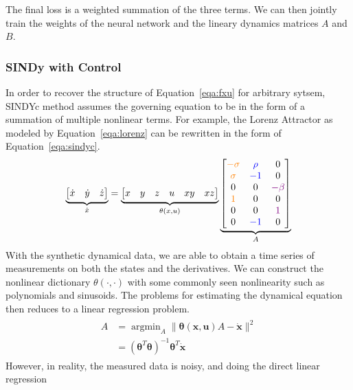 \documentclass[10pt,twocolumn]{article}
\DeclareMathOperator*{\argmin}{argmin}
\begin{document}
The final loss is a weighted summation of the three terms. We can then jointly train the
weights of the neural network and the lineary dynamics matrices $A$ and $B$.

\subsubsection{SINDy with Control \cite{sindyc}}
In order to recover the structure of Equation~\ref{eqa:fxu} for arbitrary sytsem,
SINDYc method assumes the governing equation to be in the form of a summation of
multiple nonlinear terms. For example, the Lorenz Attractor as modeled by
Equation~\ref{eqa:lorenz} can be rewritten in the form of Equation~\ref{eqa:sindyc}.
\begin{gather}\label{eqa:lorenz_sindy}
  \underbrace{
    \begin{bmatrix}
      \dot{x} & \dot{y} & \dot{z}
    \end{bmatrix}
  }_{\dot{x}}
  =
  \underbrace{
    \begin{bmatrix}
      x & y & z & u & xy & xz
    \end{bmatrix}
  }_{\theta(x, u)}
  \underbrace{
    \begin{bmatrix}
      {\color{orange}-\sigma} & {\color{blue}\rho} & 0 \\
      {\color{orange}\sigma} & {\color{blue}-1} & 0 \\
      0 & 0 & {\color{violet}-\beta} \\
      {\color{orange}1} & 0 & 0 \\
      0 & 0 & {\color{violet}1} \\
      0 & {\color{blue}-1} & 0
    \end{bmatrix}
  }_{A}
\end{gather}
With the synthetic dynamical data, we are able to obtain a time series of measurements
on both the states and the derivatives. We can construct the nonlinear dictionary
$\theta(\cdot, \cdot)$ with some commonly seen nonlinearity such as polynomials and
sinusoids. The problems for estimating the dynamical equation then reduces to a
linear regression problem.
\begin{gather}
  \begin{aligned}
    A &=  \argmin_A \| \bm{\theta}(\bm{x}, \bm{u})A - \dot{\bm{x}} \|^2 \\
      &= (\bm{\theta}^T \bm{\theta})^{-1}\bm{\theta}^T \dot{\bm{x}}
  \end{aligned}
\end{gather}
However, in reality, the measured data is noisy, and doing the direct linear regression
\end{document}
